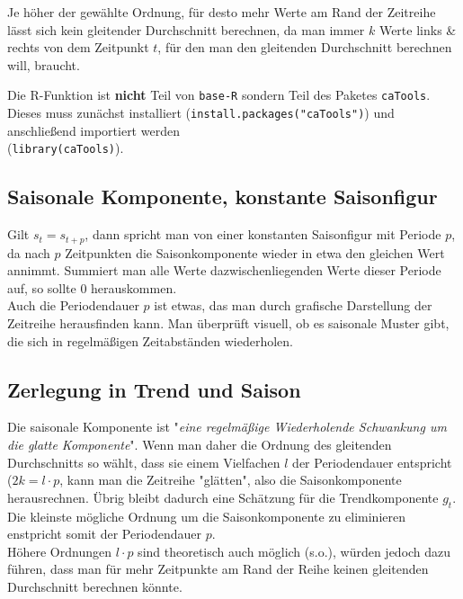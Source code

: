 \documentclass[a4paper]{article}
\newcommand\dangersign{%
 \makebox[1.8em][c]{%
 \makebox[0pt][c]{\raisebox{.15em}{\small!}}%
 \makebox[0pt][c]{\color{red}\Large$\triangle$}}}%
\begin{document}
\noindent \dangersign Je höher der gewählte Ordnung, für desto mehr Werte am Rand der Zeitreihe lässt sich kein gleitender Durchschnitt berechnen, da man immer $k$ Werte links \& rechts von dem Zeitpunkt $t$, für den man den gleitenden Durchschnitt berechnen will, braucht.\\

\noindent {}

\noindent \dangersign Die R-Funktion ist \textbf{nicht} Teil von \texttt{base-R} sondern Teil des Paketes \texttt{caTools}. Dieses muss zunächst installiert (\texttt{install.packages("caTools")}) und anschließend importiert werden\\(\texttt{library(caTools)}).


\subsection{Saisonale Komponente, konstante Saisonfigur}
Gilt $s_t = s_{t+p}$, dann spricht man von einer konstanten Saisonfigur mit Periode $p$, da nach $p$ Zeitpunkten die Saisonkomponente wieder in etwa den gleichen Wert annimmt. Summiert man alle Werte dazwischenliegenden Werte dieser Periode auf, so sollte 0 herauskommen.\\

\noindent \dangersign Auch die Periodendauer $p$ ist etwas, das man durch grafische Darstellung der Zeitreihe herausfinden kann. Man überprüft visuell, ob es saisonale Muster gibt, die sich in regelmäßigen Zeitabständen wiederholen.

\subsection{Zerlegung in Trend und Saison}
Die saisonale Komponente ist "\textit{eine regelmäßige Wiederholende Schwankung um die glatte Komponente}". Wenn man daher die Ordnung des gleitenden Durchschnitts so wählt, dass sie einem Vielfachen $l$ der Periodendauer entspricht ($2k = l \cdotp p$, kann man die Zeitreihe "glätten", also die Saisonkomponente herausrechnen. Übrig bleibt dadurch eine Schätzung für die Trendkomponente $g_t$.
Die kleinste mögliche Ordnung um die Saisonkomponente zu eliminieren enstpricht somit der Periodendauer $p$.\\

\noindent \dangersign Höhere Ordnungen $l \cdot p$ sind theoretisch auch möglich (s.o.), würden jedoch dazu führen, dass man für mehr Zeitpunkte am Rand der Reihe keinen gleitenden Durchschnitt berechnen könnte.\\
\end{document}
